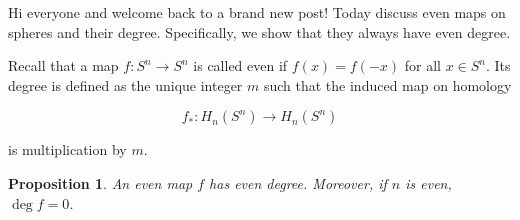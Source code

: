 \documentclass[a4paper, 12pt]{article}
\theoremstyle{definition}
\theoremstyle{plain}
\newtheorem{proposition}[definition]{Proposition}
\theoremstyle{remark}
\begin{document}
Hi everyone and welcome back to a brand new post! Today discuss even maps on spheres and their degree. Specifically, we show that they always have even degree.

Recall that a map \( f \colon S^n \to S^n \) is called even if \( f(x) = f(-x) \) for all \( x \in S^n \). Its degree is defined as the unique integer \( m \) such that the induced map on homology

\begin{equation*}
    f_* \colon H_n(S^n) \to H_n(S^n)
\end{equation*}

is multiplication by \( m \).

\begin{proposition}
    An even map \( f \) has even degree. Moreover, if \( n \) is even, \( \deg f = 0 \).
\end{proposition}
\end{document}
